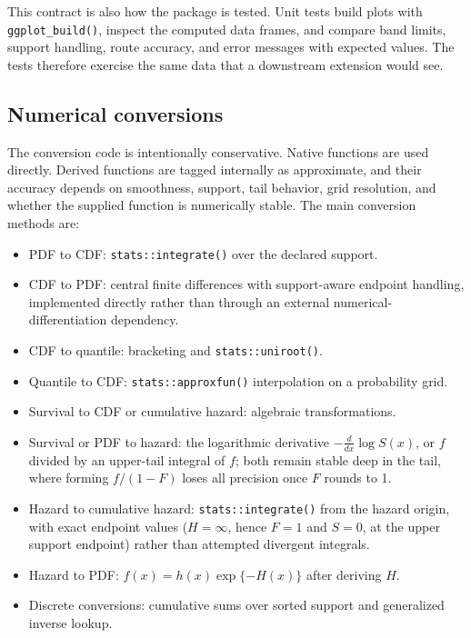 This contract is also how the package is tested. Unit tests build plots with
\texttt{ggplot\_build()}, inspect the computed data frames, and compare
band limits, support handling, route accuracy, and error messages with expected
values. The tests therefore exercise the same data that a downstream extension
would see.

\subsection{Numerical conversions}\label{numerical-conversions}

The conversion code is intentionally conservative. Native functions are used
directly. Derived functions are tagged internally as approximate, and their
accuracy depends on smoothness, support, tail behavior, grid resolution, and
whether the supplied function is numerically stable. The main conversion methods
are:

\begin{itemize}
\tightlist
\item
  PDF to CDF: \texttt{stats::integrate()} over the declared support.
\item
  CDF to PDF: central finite differences with support-aware endpoint handling,
  implemented directly rather than through an external numerical-differentiation
  dependency.
\item
  CDF to quantile: bracketing and \texttt{stats::uniroot()}.
\item
  Quantile to CDF: \texttt{stats::approxfun()} interpolation on a probability grid.
\item
  Survival to CDF or cumulative hazard: algebraic transformations.
\item
  Survival or PDF to hazard: the logarithmic derivative \(-\tfrac{d}{dx}\log
  S(x)\), or \(f\) divided by an upper-tail integral of \(f\); both remain stable
  deep in the tail, where forming \(f/(1-F)\) loses all precision once \(F\)
  rounds to 1.
\item
  Hazard to cumulative hazard: \texttt{stats::integrate()} from the hazard origin,
  with exact endpoint values (\(H = \infty\), hence \(F = 1\) and \(S = 0\), at the
  upper support endpoint) rather than attempted divergent integrals.
\item
  Hazard to PDF: \(f(x) = h(x)\exp\{-H(x)\}\) after deriving \(H\).
\item
  Discrete conversions: cumulative sums over sorted support and generalized
  inverse lookup.
\end{itemize}

